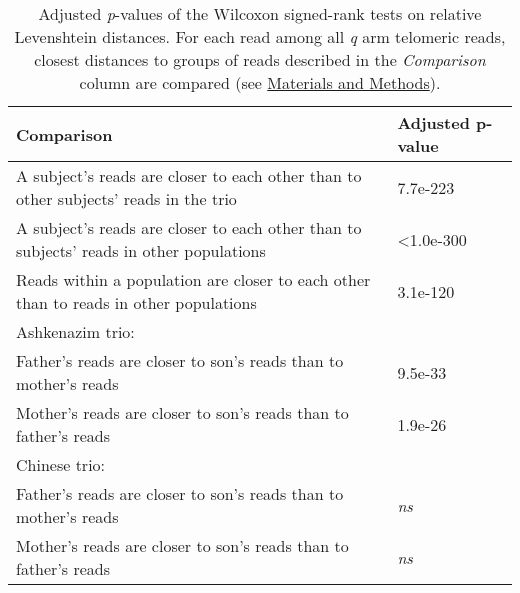 \begin{samepage} \begin{table}[h!] \small \begin{tabular}{ll}
\hline
\textbf{Comparison}                                                                     & \textbf{Adjusted p-value} \\
\hline
A subject's reads are closer to each other than to other subjects' reads in the trio    & 7.7e-223                  \\
A subject's reads are closer to each other than to subjects' reads in other populations & <1.0e-300                 \\
Reads within a population are closer to each other than to reads in other populations   & 3.1e-120                  \\
Ashkenazim trio:                                                                        & \textbf{}                 \\
\hspace{.5cm} Father's reads are closer to son's reads than to mother's reads           & 9.5e-33                   \\
\hspace{.5cm} Mother's reads are closer to son's reads than to father's reads           & 1.9e-26                   \\
Chinese trio:                                                                           & \textbf{}                 \\
\hspace{.5cm} Father's reads are closer to son's reads than to mother's reads           & \textit{ns}               \\
\hspace{.5cm} Mother's reads are closer to son's reads than to father's reads           & \textit{ns}               \\
\hline
\end{tabular}
\caption{
    \small Adjusted \textit{p}-values of the Wilcoxon signed-rank tests on relative Levenshtein distances.
    For each read among all \textit{q} arm telomeric reads,
    closest distances to groups of reads described in the \textit{Comparison} column are compared
    (see \hyperref[sec:methods]{Materials and Methods}).
}
\label{tab:haptests}
\end{table}
\end{samepage}
